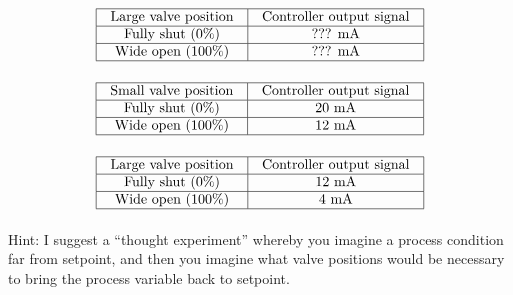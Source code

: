 $$\vbox{\offinterlineskip
\halign{\strut
\vrule \quad\hfil # \ \hfil & 
\vrule \quad\hfil # \ \hfil \vrule \cr
\noalign{\hrule}
%
Large valve position & Controller output signal \cr
%
\noalign{\hrule}
%
Fully shut (0\%) & ??? mA \cr
%
\noalign{\hrule}
%
Wide open (100\%) & ??? mA \cr
%
\noalign{\hrule}
} %
}$$ %









$$\vbox{\offinterlineskip
\halign{\strut
\vrule \quad\hfil # \ \hfil & 
\vrule \quad\hfil # \ \hfil \vrule \cr
\noalign{\hrule}
%
Small valve position & Controller output signal \cr
%
\noalign{\hrule}
%
Fully shut (0\%) & 20 mA \cr
%
\noalign{\hrule}
%
Wide open (100\%) & 12 mA \cr
%
\noalign{\hrule}
} %
}$$ %


$$\vbox{\offinterlineskip
\halign{\strut
\vrule \quad\hfil # \ \hfil & 
\vrule \quad\hfil # \ \hfil \vrule \cr
\noalign{\hrule}
%
Large valve position & Controller output signal \cr
%
\noalign{\hrule}
%
Fully shut (0\%) & 12 mA \cr
%
\noalign{\hrule}
%
Wide open (100\%) & 4 mA \cr
%
\noalign{\hrule}
} %
}$$ %


\vskip 10pt

Hint: I suggest a ``thought experiment'' whereby you imagine a process condition far from setpoint, and then you imagine what valve positions would be necessary to bring the process variable back to setpoint.











